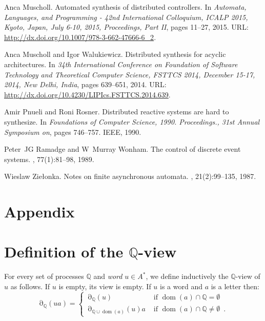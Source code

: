 \documentclass[a4paper,UKenglish]{lipics-v2016}
\newcommand{\QQ}{\mathbb{Q}}
\DeclareMathOperator{\dom}{dom}
\DeclareMathOperator{\view}{\partial}
\begin{document}
\begin{thebibliography}{10}
Anca Muscholl.
\newblock Automated synthesis of distributed controllers.
\newblock In {\em Automata, Languages, and Programming - 42nd International
  Colloquium, {ICALP} 2015, Kyoto, Japan, July 6-10, 2015, Proceedings, Part
  {II}}, pages 11--27, 2015.
\newblock URL: \url{http://dx.doi.org/10.1007/978-3-662-47666-6_2}.

Anca Muscholl and Igor Walukiewicz.
\newblock Distributed synthesis for acyclic architectures.
\newblock In {\em 34th International Conference on Foundation of Software
  Technology and Theoretical Computer Science, {FSTTCS} 2014, December 15-17,
  2014, New Delhi, India}, pages 639--651, 2014.
\newblock URL: \url{http://dx.doi.org/10.4230/LIPIcs.FSTTCS.2014.639}.

Amir Pnueli and Roni Rosner.
\newblock Distributed reactive systems are hard to synthesize.
\newblock In {\em Foundations of Computer Science, 1990. Proceedings., 31st
  Annual Symposium on}, pages 746--757. IEEE, 1990.

Peter~JG Ramadge and W~Murray Wonham.
\newblock The control of discrete event systems.
, 77(1):81--98, 1989.

Wieslaw Zie{\l}onka.
\newblock Notes on finite asynchronous automata.
, 21(2):99--135, 1987.

\end{thebibliography}

\newpage







\section*{Appendix}

\section{Definition of the $\QQ$-view}

For every set of processes $\QQ$ and \emph{word} $u\in A^*$,
we define inductively the $\QQ$-view of $u$ as
follows.
If $u$ is empty, its view is empty.
If $u$ is a word and $a$ is a letter then:
\begin{equation}\label{defview}
\view_\QQ(ua)
=
\begin{cases}
\view_\QQ(u)&  \text{ if }  \dom(a) \cap \QQ=\emptyset\\
\view_{\QQ\cup \dom(a)}(u)a
&  \text{ if }  \dom(a) \cap \QQ\neq\emptyset\enspace.
\end{cases}
\end{equation}
\end{document}
